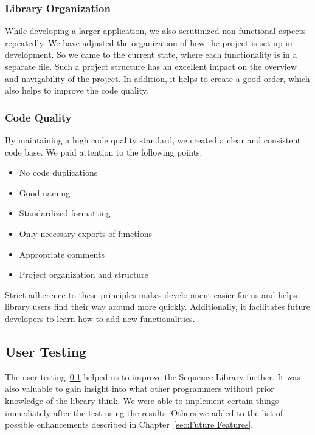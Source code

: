 \subsubsection{Library Organization}
\label{subsub:Library Organisation}
While developing a larger application, we also scrutinized non-functional
aspects repeatedly. We have adjusted the organization of how the project is set up
in development. So we came to the current state, where each
functionality is in a separate file. Such a project structure has an excellent
impact on the overview and navigability of the project. In addition, it helps
to create a good order, which also helps to improve the code quality.

\subsubsection{Code Quality}
\label{subsub:Code Quality}
By maintaining a high code quality standard, we created a clear and consistent
code base. We paid attention to the following points:

\begin{itemize}
  \item{No code duplications}
  \item{Good naming}
  \item{Standardized formatting}
  \item{Only necessary exports of functions}
  \item{Appropriate comments}
  \item{Project organization and structure}
\end{itemize}

Strict adherence to these principles makes development easier for us and helps
library users find their way around more quickly. Additionally, it facilitates
future developers to learn how to add new functionalities.

\subsection{User Testing}
\label{sub:User Testing}
The user testing~\ref{sub:User Testing} helped us to improve the Sequence Library further. It was also
valuable to gain insight into what other programmers without prior knowledge of
the library think. We were able to implement certain things immediately after
the test using the results. Others we added to the list of possible enhancements described in
Chapter~\ref{sec:Future Features}.
